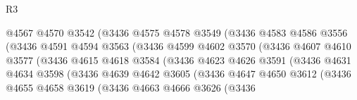 \begin{lexlean}{R3}
\begin{coremodule}
                                @4567
                                @4570
                                @3542
                                (@3436
                                  @4575
                                  @4578
                                  @3549
                                  (@3436
                                    @4583
                                    @4586
                                    @3556
                                    (@3436
                                      @4591
                                      @4594
                                      @3563
                                      (@3436
                                        @4599
                                        @4602
                                        @3570
                                        (@3436
                                          @4607
                                          @4610
                                          @3577
                                          (@3436
                                            @4615
                                            @4618
                                            @3584
                                            (@3436
                                              @4623
                                              @4626
                                              @3591
                                              (@3436
                                                @4631
                                                @4634
                                                @3598
                                                (@3436
                                                  @4639
                                                  @4642
                                                  @3605
                                                  (@3436
                                                    @4647
                                                    @4650
                                                    @3612
                                                    (@3436
                                                      @4655
                                                      @4658
                                                      @3619
                                                      (@3436
                                                        @4663
                                                        @4666
                                                        @3626
                                                        (@3436

\end{coremodule}
\end{lexlean}
